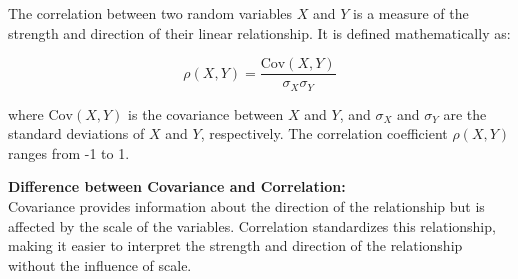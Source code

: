 \begin{definition}
    The correlation between two random variables \( X \) and \( Y \) is a measure of the strength and direction of their linear relationship. It is defined mathematically as:

\[
\rho(X, Y) = \frac{\text{Cov}(X, Y)}{\sigma_X \sigma_Y}
\]

where \( \text{Cov}(X, Y) \) is the covariance between \( X \) and \( Y \), and \( \sigma_X \) and \( \sigma_Y \) are the standard deviations of \( X \) and \( Y \), respectively. The correlation coefficient \( \rho(X, Y) \) ranges from -1 to 1.
\end{definition}

\textbf{Difference between Covariance and Correlation:}\\

Covariance provides information about the direction of the relationship but is affected by the scale of the variables. Correlation standardizes this relationship, making it easier to interpret the strength and direction of the relationship without the influence of scale.